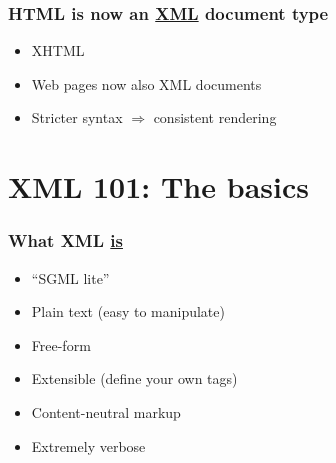 

\frame
{
	\frametitle{HTML is now an \uline{XML} document type}
	
	\begin{itemize}
	
		\item XHTML
		
		\item Web pages now also XML documents
		
		
		\item Stricter syntax \(\Rightarrow\) consistent rendering
	
	\end{itemize}

}




\section{XML 101: The basics}





\frame
{
	\frametitle{What XML \uline{is}}
	
	\begin{itemize}
	
		\item ``SGML lite''
	
		\item Plain text (easy to manipulate)
		
		\item Free-form
		
		\item Extensible (define your own tags)
		
		\item Content-neutral markup
		
		\item Extremely verbose
	
	\end{itemize}
}

\usebackgroundtemplate{}




